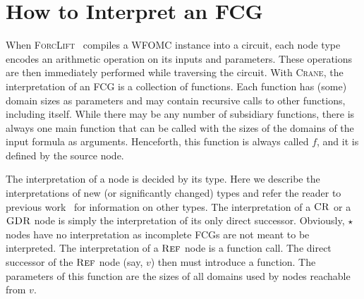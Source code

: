 \documentclass{article}
\theoremstyle{definition}
\DeclareMathOperator{\CR}{\textsc{CR}}
\DeclareMathOperator{\GDR}{\textsc{GDR}}
\DeclareMathOperator{\Reff}{\textsc{Ref}}
\begin{document}
\section{How to Interpret an FCG}\label{sec:interpret}

When \textsc{ForcLift}~\cite{DBLP:conf/ijcai/BroeckTMDR11} compiles a WFOMC
instance into a circuit, each node type encodes an arithmetic operation on its
inputs and parameters. These operations are then immediately performed while
traversing the circuit. With \textsc{Crane}, the interpretation of an FCG is a
collection of functions. Each function has (some) domain sizes as parameters and
may contain recursive calls to other functions, including itself. While there
may be any number of subsidiary functions, there is always one main function
that can be called with the sizes of the domains of the input formula as
arguments. Henceforth, this function is always called $f$, and it is defined by
the source node.

The interpretation of a node is decided by its type. Here we describe the
interpretations of new (or significantly changed) types and refer the reader to
previous work~\cite{DBLP:conf/ijcai/BroeckTMDR11} for information on other
types. The interpretation of a $\CR$ or a $\GDR$ node is simply the
interpretation of its only direct successor. Obviously, $\star$ nodes have no
interpretation as incomplete FCGs are not meant to be interpreted. The
interpretation of a $\Reff$ node is a function call. The direct successor of the
$\Reff$ node (say, $v$) then must introduce a function. The parameters of this
function are the sizes of all domains used by nodes reachable from $v$.
\end{document}
